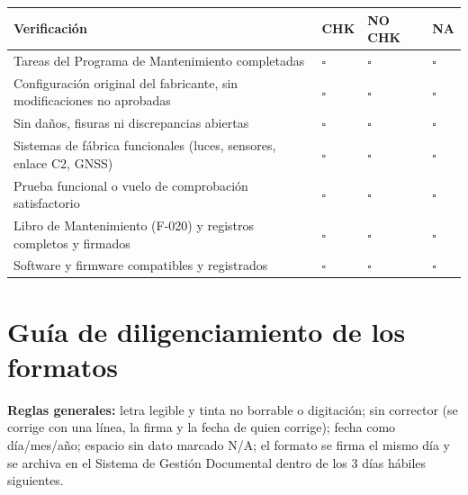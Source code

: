 
\begin{tabularx}{\textwidth}{|X|p{1.5cm}|p{1.8cm}|p{1.5cm}|}
\hline
\rowcolor[gray]{0.9}\textbf{Verificación} & \textbf{CHK} & \textbf{NO CHK} & \textbf{NA} \\ \hline
Tareas del Programa de Mantenimiento completadas & $\square$ & $\square$ & $\square$ \\ \hline
Configuración original del fabricante, sin modificaciones no aprobadas & $\square$ & $\square$ & $\square$ \\ \hline
Sin daños, fisuras ni discrepancias abiertas & $\square$ & $\square$ & $\square$ \\ \hline
Sistemas de fábrica funcionales (luces, sensores, enlace C2, GNSS) & $\square$ & $\square$ & $\square$ \\ \hline
Prueba funcional o vuelo de comprobación satisfactorio & $\square$ & $\square$ & $\square$ \\ \hline
Libro de Mantenimiento (F-020) y registros completos y firmados & $\square$ & $\square$ & $\square$ \\ \hline
Software y firmware compatibles y registrados & $\square$ & $\square$ & $\square$ \\ \hline
\end{tabularx}
\vspace{0.3cm}
\firmas

\clearpage
\section{Guía de diligenciamiento de los formatos}\label{fmt:guia}
\renewcommand{\arraystretch}{1.3}
\textbf{Reglas generales:} letra legible y tinta no borrable o digitación; sin corrector (se corrige con una línea, la firma y la fecha de quien corrige); fecha como día/mes/año; espacio sin dato marcado N/A; el formato se firma el mismo día y se archiva en el Sistema de Gestión Documental dentro de los 3 días hábiles siguientes.

